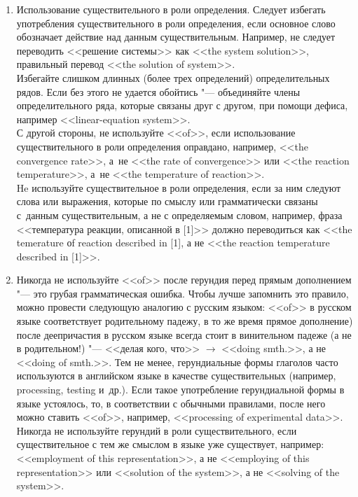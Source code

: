 \documentclass[a5paper, 10pt, twoside, numbers=enddot]{scrartcl}
\newcommand{\etal}{и~др.\xspace}
\begin{document}
\begin{enumerate}
  \item Использование существительного в роли определения. Следует избегать употребления
    существительного в роли определения, если основное слово  обозначает действие над данным
    существительным. Например, не следует переводить <<решение системы>> как <<the system
    solution>>, правильный перевод <<the solution of system>>.\\ [4pt]
    Избегайте слишком длинных (более трех определений) определительных рядов. Если без этого не
    удается обойтись "--- объединяйте члены определительного ряда, которые связаны друг с другом,
    при помощи дефиса, например <<linear-equation system>>.\\ [4pt]
    С другой стороны, не используйте <<of>>, если использование существительного в роли определения
    оправдано, например, <<the convergence rate>>, а~не <<the rate of convergence>> или <<the
    reaction temperature>>, а~не <<the tem\-perature of reaction>>.\\ [4pt]
    He используйте существительное в роли определения, если за ним следуют слова или выражения,
    которые по смыслу или грамматически связаны с~данным существительным, а не с определяемым
    словом, например, фраза <<температура реакции, описанной в [1]>> должно переводиться как <<the
    temerature оf reaction described in [1], а не <<the reaction temperature described in [1]>>.

  \item Никогда не используйте <<of>> после герундия перед прямым дополнением "--- это грубая
    грамматическая ошибка. Чтобы лучше запомнить это правило, можно провести следующую аналогию с
    русским языком: <<of>> в русском языке соответствует родительному падежу, в то же время прямое
    дополнение) после деепричастия в русском языке всегда стоит в винительном падеже (а не в
    родительном!) "--- <<делая кого, что>> $\rightarrow$ <<doing smth.>>, а не <<doing of smth.>>.
    Тем не менее, герундиальные формы глаголов часто используются в английском языке в качестве
    существительных (например, processing, testing \etal). Если такое употребление герундиальной
    формы в языке устоялось, то, в  соответствии с обычными правилами, после него можно ставить
    <<of>>, например, <<processing of experimental data>>.\\ [4pt]
    Никогда не используйте герундий в роли существительного, если существительное с тем же смыслом в
    языке уже существует, например: <<employment of this representation>>, а не <<employing of this
    representation>> или <<solution of the system>>, а не <<solving of the system>>.


\end{enumerate}
\end{document}
